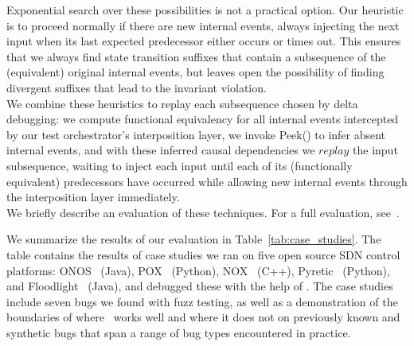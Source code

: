 

Exponential search over these possibilities is not a practical option. Our heuristic
is to proceed normally if there are new internal events,
always injecting the next input when its last expected predecessor
either occurs or times out. This ensures that we always find state transition suffixes that
contain a subsequence of the (equivalent) original internal events, but leaves open the
possibility of finding divergent suffixes that lead to the invariant
violation.\\[0.5ex]
%
%
 We combine these heuristics to replay each
subsequence chosen by delta debugging: we compute functional equivalency
for all internal events intercepted by our test orchestrator's
interposition layer, we invoke {\sc Peek()} to infer absent internal events,
and with these inferred causal dependencies we $replay$
the input subsequence, waiting to inject each input until each of its
(functionally equivalent) predecessors have occurred while allowing
new internal events through the interposition layer immediately.\\[0.5ex]
%
 We briefly describe an evaluation of these
techniques. For a full evaluation, see~\cite{sts2014}.

We summarize the results of our evaluation in Table~\ref{tab:case_studies}.
The table contains the results of case studies we ran on
five open source SDN control platforms:
ONOS~\cite{ONOS} (Java), POX~\cite{pox} (Python), NOX~\cite{nox} (C++),
Pyretic~\cite{frenetic} (Python), and Floodlight~\cite{floodlight} (Java), and
debugged these with the help of \projectname. The case studies include seven
bugs we found with fuzz testing, as well as a demonstration of the
boundaries of where \projectname~works well and where it does not on
previously known and synthetic bugs that span a range of bug types
encountered in practice.


